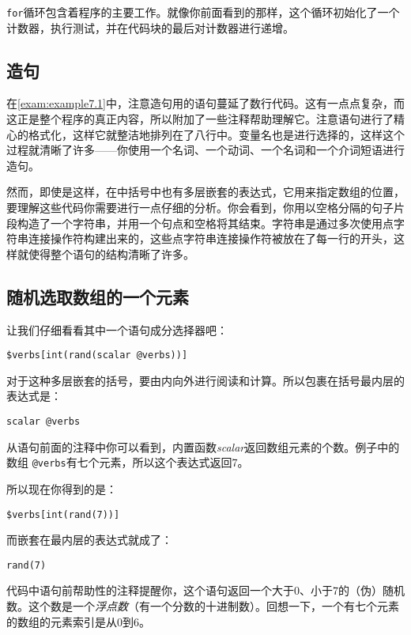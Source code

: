  \verb|for|循环包含着程序的主要工作。就像你前面看到的那样，这个循环初始化了一个计数器，执行测试，并在代码块的最后对计数器进行递增。

\subsection{造句}
在\autoref{exam:example7.1}中，注意造句用的语句蔓延了数行代码。这有一点点复杂，而这正是整个程序的真正内容，所以附加了一些注释帮助理解它。注意语句进行了精心的格式化，这样它就整洁地排列在了八行中。变量名也是进行选择的，这样这个过程就清晰了许多——你使用一个名词、一个动词、一个名词和一个介词短语进行造句。

然而，即使是这样，在中括号中也有多层嵌套的表达式，它用来指定数组的位置，要理解这些代码你需要进行一点仔细的分析。你会看到，你用以空格分隔的句子片段构造了一个字符串，并用一个句点和空格将其结束。字符串是通过多次使用点字符串连接操作符构建出来的，这些点字符串连接操作符被放在了每一行的开头，这样就使得整个语句的结构清晰了许多。

\subsection{随机选取数组的一个元素}
让我们仔细看看其中一个语句成分选择器吧：

\begin{lstlisting}
$verbs[int(rand(scalar @verbs))] 
\end{lstlisting}

对于这种多层嵌套的括号，要由内向外进行阅读和计算。所以包裹在括号最内层的表达式是：

\begin{lstlisting}
scalar @verbs
\end{lstlisting}

从语句前面的注释中你可以看到，内置函数\textit{scalar}返回数组元素的个数。例子中的数组 \verb|@verbs|有七个元素，所以这个表达式返回7。

所以现在你得到的是：

\begin{lstlisting}
$verbs[int(rand(7))]
\end{lstlisting}

而嵌套在最内层的表达式就成了：

\begin{lstlisting}
rand(7)
\end{lstlisting}

代码中语句前帮助性的注释提醒你，这个语句返回一个大于0、小于7的（伪）随机数。这个数是一个\textit{浮点数}（有一个分数的十进制数）。回想一下，一个有七个元素的数组的元素索引是从0到6。

